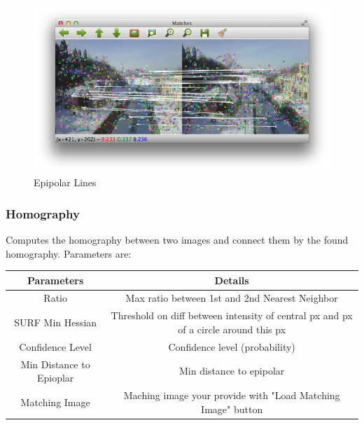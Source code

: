\documentclass{article}
\begin{document}
\begin{figure}[H]
\begin{center}
\includegraphics[scale=0.5]{toolboxEpipolarLines.png}
\caption{Epipolar Lines}
\end{center}
\end{figure}	   


\subsubsection{Homography}
Computes the homography between two images and connect them by the found homography. Parameters are:

	\begin{table}[H]
\begin{center}
\begin{tabular}{|c|c|l|l|l|}
\hline
\textbf{Parameters}      & \multicolumn{4}{|c|}{\textbf{Details}}                                                                    \\ \hline
Ratio                    & \multicolumn{4}{|c|}{Max ratio between 1st and 2nd Nearest Neighbor}                                      \\ \hline
SURF Min Hessian         & \multicolumn{4}{|c|}{Threshold on diff between intensity of central px and px of a circle around this px} \\ \hline
Confidence Level         & \multicolumn{4}{|c|}{Confidence level (probability)}                                                      \\ \hline
Min Distance to Epioplar & \multicolumn{4}{|c|}{Min distance to epipolar}                                                            \\ \hline
Matching Image           & \multicolumn{4}{|c|}{Maching image your provide with "Load Matching Image" button}                        \\ \hline
\end{tabular}
\end{center}
\end{table}
\end{document}
